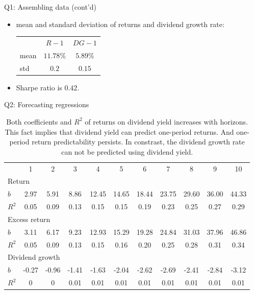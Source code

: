 \documentclass[10pt,t]{beamer}
\begin{document}
\begin{frame}{Q1: Assembling data (cont'd)}
\begin{itemize}
  \item mean and standard deviation of returns and dividend growth rate:
\begin{table}
\begin{tabular}{lcc}
\toprule
& $R - 1$ & $DG - 1$ \\
\cmidrule{1-3}
mean & $11.78\%$ & $5.89\%$ \\
std & $0.2$ & $0.15$ \\
\bottomrule
\end{tabular}
\end{table}
\item Sharpe ratio is $0.42$.
\end{itemize}
\end{frame}


\begin{frame}{Q2: Forecasting regressions}
\begin{table}
\footnotesize
\begin{tabular}{lcccccccccc}
\toprule
& 1 & 2 & 3 & 4 & 5 & 6 & 7 & 8 & 9 & 10\\
\cmidrule{1-11}
\multicolumn{11}{l}{Return} \\
$b$ & 2.97 & 5.91 & 8.86 & 12.45 & 14.65 & 18.44 & 23.75 & 29.60 & 36.00 & 44.33 \\
$R^2$ & 0.05 & 0.09 & 0.13 & 0.15 & 0.15 & 0.19 & 0.23 & 0.25 & 0.27 & 0.29 \\
\multicolumn{11}{l}{Excess return} \\
$b$ & 3.11 & 6.17 & 9.23& 12.93 & 15.29 & 19.28 & 24.84 & 31.03 & 37.96 & 46.86 \\
$R^2$ & 0.05 & 0.09 & 0.13 & 0.15 & 0.16 & 0.20 & 0.25 & 0.28 & 0.31 & 0.34 \\
\multicolumn{11}{l}{Dividend growth} \\
$b$ & -0.27 & -0.96 & -1.41 & -1.63 & -2.04 & -2.62 & -2.69 & -2.41 & -2.84 & -3.12\\
$R^2$ & 0 & 0 & 0.01 & 0.01 & 0.01 & 0.01 & 0.01 & 0.01& 0.01 & 0.01\\
\bottomrule
\end{tabular}
\caption{Both coefficients and $R^2$ of returns on dividend yield increases with horizons. This fact implies that dividend yield can predict one-period returns. And one-period return predictability persists. In constrast, the dividend growth rate can not be predicted using dividend yield.}
\end{table}
\end{frame}
\end{document}
